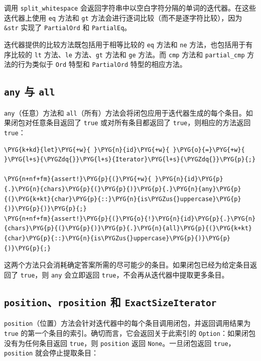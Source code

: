 调用 \texttt{split\_whitespace} 会返回字符串中以空白字符分隔的单词的迭代器。在这些迭代器上使用 \texttt{eq} 方法和 \texttt{gt} 方法会进行逐词比较（而不是逐字符比较），因为 \texttt{\&str} 实现了 \texttt{PartialOrd} 和 \texttt{PartialEq}。

迭代器提供的比较方法既包括用于相等比较的 \texttt{eq} 方法和 \texttt{ne} 方法，也包括用于有序比较的 \texttt{lt} 方法、\texttt{le} 方法、\texttt{gt} 方法和 \texttt{ge} 方法。而 \texttt{cmp} 方法和 \texttt{partial\_cmp} 方法的行为类似于 \texttt{Ord} 特型和 \texttt{PartialOrd} 特型的相应方法。

\subsection{\texttt{any} 与 \texttt{all}}

\texttt{any}（任意）方法和 \texttt{all}（所有）方法会将闭包应用于迭代器生成的每个条目。如果闭包对任意条目返回了 \texttt{true} 或对所有条目都返回了 \texttt{true}，则相应的方法返回 \texttt{true}：

\begin{Verbatim}[commandchars=\\\{\},breaklines=true,breakanywhere=true,fontsize=\codefont,xleftmargin=17bp]
\PYG{k+kd}{let}\PYG{+w}{ }\PYG{n}{id}\PYG{+w}{ }\PYG{o}{=}\PYG{+w}{ }\PYG{l+s}{\PYGZdq{}}\PYG{l+s}{Iterator}\PYG{l+s}{\PYGZdq{}}\PYG{p}{;}

\PYG{n+nf+fm}{assert!}\PYG{p}{(}\PYG{+w}{ }\PYG{n}{id}\PYG{p}{.}\PYG{n}{chars}\PYG{p}{(}\PYG{p}{)}\PYG{p}{.}\PYG{n}{any}\PYG{p}{(}\PYG{k+kt}{char}\PYG{p}{::}\PYG{n}{is\PYGZus{}uppercase}\PYG{p}{)}\PYG{p}{)}\PYG{p}{;}
\PYG{n+nf+fm}{assert!}\PYG{p}{(}\PYG{o}{!}\PYG{n}{id}\PYG{p}{.}\PYG{n}{chars}\PYG{p}{(}\PYG{p}{)}\PYG{p}{.}\PYG{n}{all}\PYG{p}{(}\PYG{k+kt}{char}\PYG{p}{::}\PYG{n}{is\PYGZus{}uppercase}\PYG{p}{)}\PYG{p}{)}\PYG{p}{;}
\end{Verbatim}

这两个方法只会消耗确定答案所需的尽可能少的条目。如果闭包已经为给定条目返回了 \texttt{true}，则 \texttt{any} 会立即返回 \texttt{true}，不会再从迭代器中提取更多条目。

\subsection{\texttt{position}、\texttt{rposition} 和 \texttt{ExactSizeIterator}}

\texttt{position}（位置）方法会针对迭代器中的每个条目调用闭包，并返回调用结果为 \texttt{true} 的第一个条目的索引。确切而言，它会返回关于此索引的 \texttt{Option}：如果闭包没有为任何条目返回 \texttt{true}，则 \texttt{position} 返回 \texttt{None}。一旦闭包返回 \texttt{true}，\texttt{position} 就会停止提取条目：

